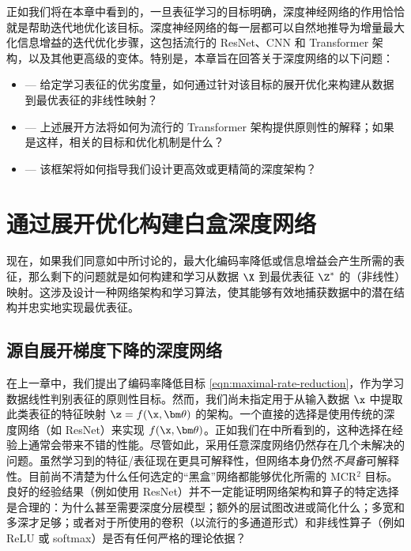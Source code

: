\documentclass[../../book-main_zh.tex]{subfiles}
\begin{document}
正如我们将在本章中看到的，一旦表征学习的目标明确，深度神经网络的作用恰恰就是帮助迭代地优化该目标。深度神经网络的每一层都可以自然地推导为增量最大化信息增益的迭代优化步骤，这包括流行的 ResNet、CNN 和 Transformer 架构，以及其他更高级的变体。特别是，本章旨在回答关于深度网络的以下问题：
\begin{itemize}
    \item {} --- 给定学习表征的优劣度量，如何通过针对该目标的展开优化来构建从数据到最优表征的非线性映射？
    \item {} --- 上述展开方法将如何为流行的 Transformer 架构提供原则性的解释；如果是这样，相关的目标和优化机制是什么？
    \item {} --- 该框架将如何指导我们设计更高效或更精简的深度架构？
\end{itemize}

\section{通过展开优化构建白盒深度网络}\label{sec:chap4-white-box-model-via-unrolling}

现在，如果我们同意如中所讨论的，最大化编码率降低或信息增益会产生所需的表征，那么剩下的问题就是如何构建和学习从数据 $\X$ 到最优表征 $\Z^*$ 的（非线性）映射。这涉及设计一种网络架构和学习算法，使其能够有效地捕获数据中的潜在结构并忠实地实现最优表征。

\subsection{源自展开梯度下降的深度网络}

在上一章中，我们提出了编码率降低目标 \eqref{eqn:maximal-rate-reduction}，作为学习数据线性判别表征的原则性目标。然而，我们尚未指定用于从输入数据 $\x$ 中提取此类表征的特征映射 $\z = f(\x, \bm \theta)$ 的架构。一个直接的选择是使用传统的深度网络（如 ResNet）来实现 $f(\x, \bm \theta)$。正如我们在中所看到的，这种选择在经验上通常会带来不错的性能。尽管如此，采用任意深度网络仍然存在几个未解决的问题。虽然学习到的特征/表征现在更具可解释性，但网络本身仍然{\em 不具备}可解释性。目前尚不清楚为什么任何选定的“黑盒”网络都能够优化所需的 MCR$^2$ 目标。良好的经验结果（例如使用 ResNet）并不一定能证明网络架构和算子的特定选择是合理的：为什么甚至需要深度分层模型；额外的层试图改进或简化什么；多宽和多深才足够；或者对于所使用的卷积（以流行的多通道形式）和非线性算子（例如 ReLU 或 softmax）是否有任何严格的理论依据？
\end{document}
